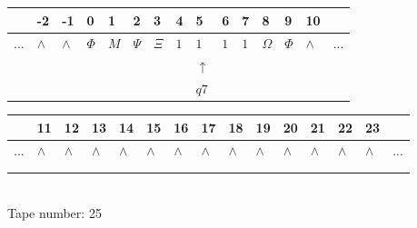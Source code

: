\documentclass[11pt]{article}
\begin{document}
\begin{table}[H]
\centering
\begin{tabular}{lllllllllllllll}
 & -2 & -1 & 0 & 1 & 2 & 3 & 4 & 5 & 6 & 7 & 8 & 9 & 10 & \\
\hline
$...$ & \multicolumn{1}{|l|}{$\wedge$} & \multicolumn{1}{|l|}{$\wedge$} & \multicolumn{1}{|l|}{$\Phi$} & \multicolumn{1}{|l|}{$M$} & \multicolumn{1}{|l|}{$\Psi$} & \multicolumn{1}{|l|}{$\Xi$} & \multicolumn{1}{|l|}{$1$} & \multicolumn{1}{|l|}{$1$} & \multicolumn{1}{|l|}{$1$} & \multicolumn{1}{|l|}{$1$} & \multicolumn{1}{|l|}{$\Omega$} & \multicolumn{1}{|l|}{$\Phi$} & \multicolumn{1}{|l|}{$\wedge$} & $...$\\
\hline
&  &  &  &  &  &  &  & $\uparrow$ &  &  &  &  &  &  \\
&  &  &  &  &  &  &  & $ q7 $ &  &  &  &  &  &  \\
\end{tabular}
\begin{tabular}{lllllllllllllll}
 & 11 & 12 & 13 & 14 & 15 & 16 & 17 & 18 & 19 & 20 & 21 & 22 & 23 & \\
\hline
$...$ & \multicolumn{1}{|l|}{$\wedge$} & \multicolumn{1}{|l|}{$\wedge$} & \multicolumn{1}{|l|}{$\wedge$} & \multicolumn{1}{|l|}{$\wedge$} & \multicolumn{1}{|l|}{$\wedge$} & \multicolumn{1}{|l|}{$\wedge$} & \multicolumn{1}{|l|}{$\wedge$} & \multicolumn{1}{|l|}{$\wedge$} & \multicolumn{1}{|l|}{$\wedge$} & \multicolumn{1}{|l|}{$\wedge$} & \multicolumn{1}{|l|}{$\wedge$} & \multicolumn{1}{|l|}{$\wedge$} & \multicolumn{1}{|l|}{$\wedge$} & $...$\\
\hline
&  &  &  &  &  &  &  &  &  &  &  &  &  &  \\
&  &  &  &  &  &  &  &  &  &  &  &  &  &  \\
\end{tabular}
\\
Tape number: 25
\noindent\makebox[\linewidth]{\hdashrule{\textwidth}{1pt}{1pt}}\end{table}
\end{document}
